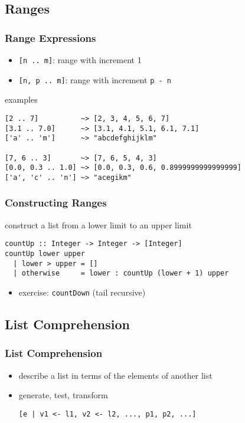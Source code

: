 \documentclass[dvipsnames]{beamer}
\theoremstyle{plain}
\begin{document}
\subsection{Ranges}

\begin{frame}[fragile]
  \frametitle{Range Expressions}

  \begin{itemize}
    \item \lstinline|[n .. m]|: range with increment 1
    \item \lstinline|[n, p .. m]|: range with increment \texttt{p - n}
  \end{itemize}

  \begin{exampleblock}{examples}
    \begin{lstlisting}
[2 .. 7]          ~> [2, 3, 4, 5, 6, 7]
[3.1 .. 7.0]      ~> [3.1, 4.1, 5.1, 6.1, 7.1]
['a' .. 'm']      ~> "abcdefghijklm"

[7, 6 .. 3]       ~> [7, 6, 5, 4, 3]
[0.0, 0.3 .. 1.0] ~> [0.0, 0.3, 0.6, 0.8999999999999999]
['a', 'c' .. 'n'] ~> "acegikm"
    \end{lstlisting}
  \end{exampleblock}
\end{frame}

\begin{frame}[fragile]
  \frametitle{Constructing Ranges}

  \begin{exampleblock}{construct a list from a lower limit to an upper limit}
    \begin{lstlisting}
countUp :: Integer -> Integer -> [Integer]
countUp lower upper
  | lower > upper = []
  | otherwise     = lower : countUp (lower + 1) upper
    \end{lstlisting}
  \end{exampleblock}

  \pause
  \begin{itemize}
    \item exercise: \lstinline|countDown| (tail recursive)
  \end{itemize}
\end{frame}

\subsection{List Comprehension}

\begin{frame}[fragile]
  \frametitle{List Comprehension}

  \begin{itemize}
    \item describe a list in terms of the elements of another list
    \item generate, test, transform
    \begin{lstlisting}[style=syntax]
[e | v1 <- l1, v2 <- l2, ..., p1, p2, ...]
    \end{lstlisting}
  \end{itemize}
\end{frame}
\end{document}

